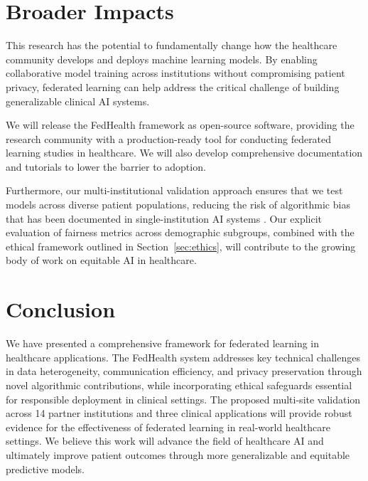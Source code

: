 \documentclass[12pt,letterpaper]{article}
\begin{document}
\section{Broader Impacts}
\label{sec:impacts}

This research has the potential to fundamentally change how the healthcare community develops and deploys machine learning models. By enabling collaborative model training across institutions without compromising patient privacy, federated learning can help address the critical challenge of building generalizable clinical AI systems.

We will release the FedHealth framework as open-source software, providing the research community with a production-ready tool for conducting federated learning studies in healthcare. We will also develop comprehensive documentation and tutorials to lower the barrier to adoption.

Furthermore, our multi-institutional validation approach ensures that we test models across diverse patient populations, reducing the risk of algorithmic bias that has been documented in single-institution AI systems \citep{Obermeyer2019}. Our explicit evaluation of fairness metrics across demographic subgroups, combined with the ethical framework outlined in Section~\ref{sec:ethics}, will contribute to the growing body of work on equitable AI in healthcare.

\section{Conclusion}

We have presented a comprehensive framework for federated learning in healthcare applications. The FedHealth system addresses key technical challenges in data heterogeneity, communication efficiency, and privacy preservation through novel algorithmic contributions, while incorporating ethical safeguards essential for responsible deployment in clinical settings. The proposed multi-site validation across 14 partner institutions and three clinical applications will provide robust evidence for the effectiveness of federated learning in real-world healthcare settings. We believe this work will advance the field of healthcare AI and ultimately improve patient outcomes through more generalizable and equitable predictive models.



\end{document}
